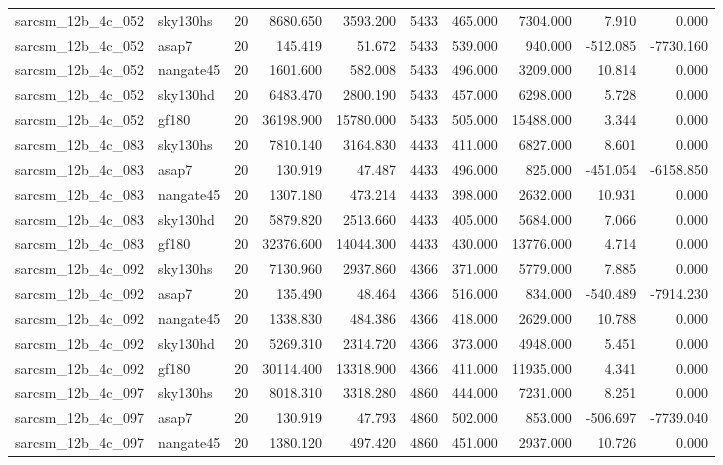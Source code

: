 \begin{tabular}{llrrrrrrrr}
sarcsm\_12b\_4c\_052 & sky130hs & 20 & 8680.650 & 3593.200 & 5433 & 465.000 & 7304.000 & 7.910 & 0.000 \\
sarcsm\_12b\_4c\_052 & asap7 & 20 & 145.419 & 51.672 & 5433 & 539.000 & 940.000 & -512.085 & -7730.160 \\
sarcsm\_12b\_4c\_052 & nangate45 & 20 & 1601.600 & 582.008 & 5433 & 496.000 & 3209.000 & 10.814 & 0.000 \\
sarcsm\_12b\_4c\_052 & sky130hd & 20 & 6483.470 & 2800.190 & 5433 & 457.000 & 6298.000 & 5.728 & 0.000 \\
sarcsm\_12b\_4c\_052 & gf180 & 20 & 36198.900 & 15780.000 & 5433 & 505.000 & 15488.000 & 3.344 & 0.000 \\
sarcsm\_12b\_4c\_083 & sky130hs & 20 & 7810.140 & 3164.830 & 4433 & 411.000 & 6827.000 & 8.601 & 0.000 \\
sarcsm\_12b\_4c\_083 & asap7 & 20 & 130.919 & 47.487 & 4433 & 496.000 & 825.000 & -451.054 & -6158.850 \\
sarcsm\_12b\_4c\_083 & nangate45 & 20 & 1307.180 & 473.214 & 4433 & 398.000 & 2632.000 & 10.931 & 0.000 \\
sarcsm\_12b\_4c\_083 & sky130hd & 20 & 5879.820 & 2513.660 & 4433 & 405.000 & 5684.000 & 7.066 & 0.000 \\
sarcsm\_12b\_4c\_083 & gf180 & 20 & 32376.600 & 14044.300 & 4433 & 430.000 & 13776.000 & 4.714 & 0.000 \\
sarcsm\_12b\_4c\_092 & sky130hs & 20 & 7130.960 & 2937.860 & 4366 & 371.000 & 5779.000 & 7.885 & 0.000 \\
sarcsm\_12b\_4c\_092 & asap7 & 20 & 135.490 & 48.464 & 4366 & 516.000 & 834.000 & -540.489 & -7914.230 \\
sarcsm\_12b\_4c\_092 & nangate45 & 20 & 1338.830 & 484.386 & 4366 & 418.000 & 2629.000 & 10.788 & 0.000 \\
sarcsm\_12b\_4c\_092 & sky130hd & 20 & 5269.310 & 2314.720 & 4366 & 373.000 & 4948.000 & 5.451 & 0.000 \\
sarcsm\_12b\_4c\_092 & gf180 & 20 & 30114.400 & 13318.900 & 4366 & 411.000 & 11935.000 & 4.341 & 0.000 \\
sarcsm\_12b\_4c\_097 & sky130hs & 20 & 8018.310 & 3318.280 & 4860 & 444.000 & 7231.000 & 8.251 & 0.000 \\
sarcsm\_12b\_4c\_097 & asap7 & 20 & 130.919 & 47.793 & 4860 & 502.000 & 853.000 & -506.697 & -7739.040 \\
sarcsm\_12b\_4c\_097 & nangate45 & 20 & 1380.120 & 497.420 & 4860 & 451.000 & 2937.000 & 10.726 & 0.000 \\

\end{tabular}
